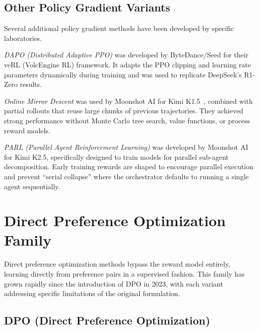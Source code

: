 \documentclass[12pt]{article}
\begin{document}
\subsection{Other Policy Gradient Variants}

Several additional policy gradient methods have been developed by specific laboratories.

\textit{DAPO (Distributed Adaptive PPO)} was developed by ByteDance/Seed for their veRL (VolcEngine RL) framework. It adapts the PPO clipping and learning rate parameters dynamically during training and was used to replicate DeepSeek's R1-Zero results.

\textit{Online Mirror Descent} was used by Moonshot AI for Kimi K1.5~\cite{Kimi2025K15}, combined with partial rollouts that reuse large chunks of previous trajectories. They achieved strong performance without Monte Carlo tree search, value functions, or process reward models.

\textit{PARL (Parallel Agent Reinforcement Learning)} was developed by Moonshot AI for Kimi K2.5, specifically designed to train models for parallel sub-agent decomposition. Early training rewards are shaped to encourage parallel execution and prevent ``serial collapse'' where the orchestrator defaults to running a single agent sequentially.


\section{Direct Preference Optimization Family}

Direct preference optimization methods bypass the reward model entirely, learning directly from preference pairs in a supervised fashion. This family has grown rapidly since the introduction of DPO in 2023, with each variant addressing specific limitations of the original formulation.

\subsection{DPO (Direct Preference Optimization)}
\end{document}
